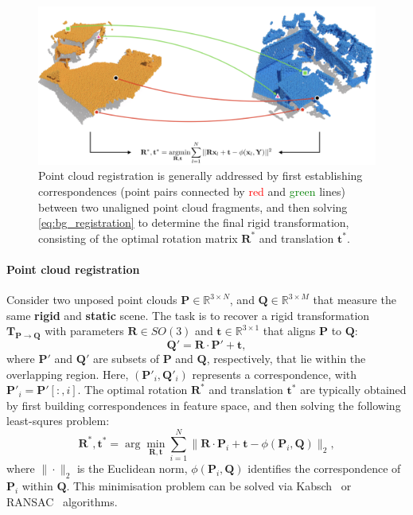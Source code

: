 \begin{figure}[t]
    \centering
    \includegraphics[width=0.8\columnwidth]{imgs/registration.png}
    \caption{Point cloud registration is generally addressed by first establishing correspondences (point pairs connected by \textcolor{red}{red} and \textcolor{green}{green} lines) between two unaligned point cloud fragments, and then solving \cref{eq:bg_registration} to determine the final rigid transformation, consisting of the optimal rotation matrix $\mathbf{R}^*$ and translation $\mathbf{t}^*$.}
    \label{fig:bg_registration}
\end{figure}

\paragraph{Point cloud registration}
Consider two unposed point clouds $\mathbf{P} \in \mathbb{R}^{3 \times N} $, and $\mathbf{Q} \in \mathbb{R}^{3 \times M}$ that measure the same \textbf{rigid} and \textbf{static} scene. The task is to recover a rigid transformation $\mathbf{T}_{\mathbf{P} \rightarrow \mathbf{Q}}$ with parameters $\mathbf{R} \in SO(3)$ and $\mathbf{t} \in \mathbb{R}^{3 \times 1}$ that aligns %
$\mathbf{P}$ to $\mathbf{Q}$:
\begin{equation}
    \mathbf{Q}' = \mathbf{R} \cdot \mathbf{P}' + \mathbf{t},
\end{equation}
where $\mathbf{P}'$ and $\mathbf{Q}'$ are subsets of $\mathbf{P}$ and $\mathbf{Q}$, respectively, that lie within the overlapping region. Here, $(\mathbf{P}'_i, \mathbf{Q}'_i)$ represents a correspondence, with $\mathbf{P}'_i = \mathbf{P}'[:,i]$.  The optimal rotation $\mathbf{R}^*$ and translation $\mathbf{t}^*$ are typically obtained by first building correspondences in feature space, and then solving the following least-squres problem:
\begin{equation}
    \mathbf{R}^*, \mathbf{t}^* = \arg \min_{\mathbf{R}, \mathbf{t}} \sum_{i=1}^N \| \mathbf{R} \cdot \mathbf{P}_i + \mathbf{t} - \phi(\mathbf{P}_i, \mathbf{Q}) \|_2,
\label{eq:bg_registration}
\end{equation}
where $\|\!\cdot\!\|_2$ is the Euclidean norm, $\phi(\mathbf{P}_i, \mathbf{Q})$ identifies the correspondence of $\mathbf{P}_i$ within $\mathbf{Q}$. This minimisation problem can be solved via Kabsch~\cite{kabsch1976solution} or RANSAC~\cite{ransac} algorithms.


